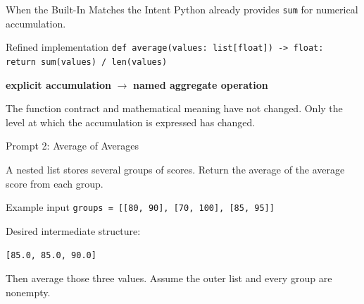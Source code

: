 \documentclass[aspectratio=169,10pt]{beamer}
\begin{document}
\begin{frame}{When the Built-In Matches the Intent}
  Python already provides \texttt{sum} for numerical accumulation.

  \begin{block}{Refined implementation}
    \texttt{def average(values: list[float]) -> float:}\\
    \hspace*{0.20in}\texttt{return sum(values) / len(values)}
  \end{block}

  \begin{center}
    \textbf{explicit accumulation} $\longrightarrow$ \textbf{named aggregate operation}
  \end{center}

  \begin{keyidea}
    The function contract and mathematical meaning have not changed. Only the level at which the accumulation is expressed has changed.
  \end{keyidea}
\end{frame}

\begin{frame}{Prompt 2: Average of Averages}
  \begin{activity}
    A nested list stores several groups of scores. Return the average of the average score from each group.
  \end{activity}

  \begin{block}{Example input}
    \texttt{groups = [[80, 90], [70, 100], [85, 95]]}
  \end{block}

  Desired intermediate structure:
  \begin{center}
    \texttt{[85.0, 85.0, 90.0]}
  \end{center}

  Then average those three values. Assume the outer list and every group are nonempty.
\end{frame}
\end{document}
